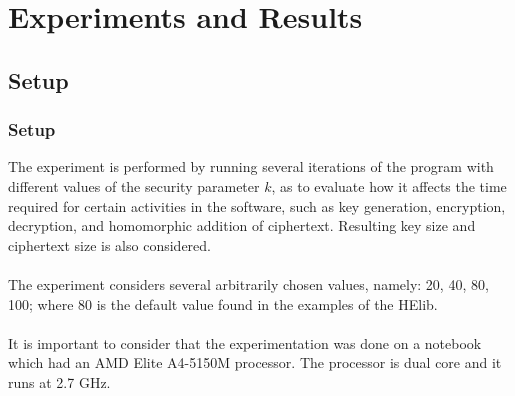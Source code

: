 \documentclass{beamer}
\begin{document}
\begin{frame}
\begin{table}[]
\centering
{}
\end{table}
\end{frame}
\section{Experiments and Results}
\subsection{Setup}
\begin{frame}
\frametitle{Setup}
The experiment is performed by running several iterations of the program with different values of the security parameter $k$, as to evaluate how it affects the time required for certain activities in the software, such as key generation, encryption, decryption, and homomorphic addition of ciphertext. Resulting key size and ciphertext size is also considered. \\~\\

The experiment considers several arbitrarily chosen values, namely: 20, 40, 80, 100; where 80 is the default value found in the examples of the HElib. \\~\\

It is important to consider that the experimentation was done on a notebook which had an AMD Elite A4-5150M processor. The processor is dual core and it runs at 2.7 GHz. 
\end{frame}
\end{document}
